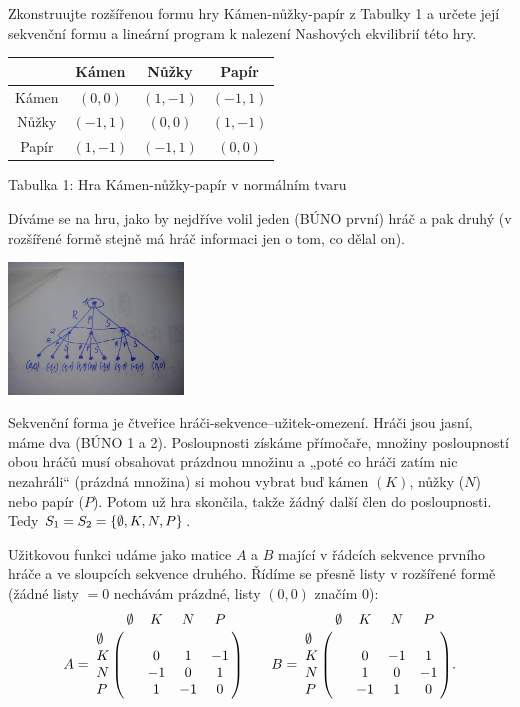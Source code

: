 \documentclass[12pt]{article}					%
\begin{document}
\begin{priklad}[4.1]
	Zkonstruujte rozšířenou formu hry Kámen-nůžky-papír z Tabulky 1 a určete její sekvenční formu a lineární program k nalezení Nashových ekvilibrií této hry.

	\begin{center}
		\begin{tabular}{c|c|c|c}
			      & Kámen      & Nůžky      & Papír      \\ \hline
			Kámen & $( 0,  0)$ & $( 1, -1)$ & $(-1,  1)$ \\
			Nůžky & $(-1,  1)$ & $( 0,  0)$ & $( 1, -1)$ \\
			Papír & $( 1, -1)$ & $(-1,  1)$ & $( 0,  0)$
		\end{tabular}

		Tabulka 1: Hra Kámen-nůžky-papír v normálním tvaru
	\end{center}

	\begin{reseni}
		Díváme se na hru, jako by nejdříve volil jeden (BÚNO první) hráč a pak druhý (v rozšířené formě stejně má hráč informaci jen o tom, co dělal on).
		\vspace{-1.5em}
		
		\begin{center}
			\includegraphics[width=0.35\textwidth]{ATH_DU4.jpg}
		\end{center}
		
		\vspace{-2.5em}
	\end{reseni}

	\begin{reseni}
		Sekvenční forma je čtveřice hráči-sekvence–užitek-omezení. Hráči jsou jasní, máme dva (BÚNO 1 a 2). Posloupnosti získáme přímočaře, množiny posloupností obou hráčů musí obsahovat prázdnou množinu a „poté co hráči zatím nic nezahráli“ (prázdná množina) si mohou vybrat buď kámen $(K)$, nůžky ($N$) nebo papír ($P$). Potom už hra skončila, takže žádný další člen do posloupnosti. Tedy $S_1 = S_2 = \{\emptyset, K, N, P\}$.

		Užitkovou funkci udáme jako matice $A$ a $B$ mající v řádcích sekvence prvního hráče a ve sloupcích sekvence druhého. Řídíme se přesně listy v rozšířené formě (žádné listy $= 0$ nechávám prázdné, listy $(0, 0)$ značím $0$):
		$$ A = \bordermatrix{ & \O & K & N & P \cr \O &  &  &  & \cr K &  & 0 & 1 & -1 \cr N &  & -1 & 0 & 1 \cr P &  & 1 & -1 & 0 } \qquad
		  B = \bordermatrix{ & \O & K & N & P \cr \O &  &  &  & \cr K &  & 0 & -1 & 1 \cr N &  & 1 & 0 & -1 \cr P &  & -1 & 1 & 0 }. $$


\end{reseni}
\end{priklad}
\end{document}
